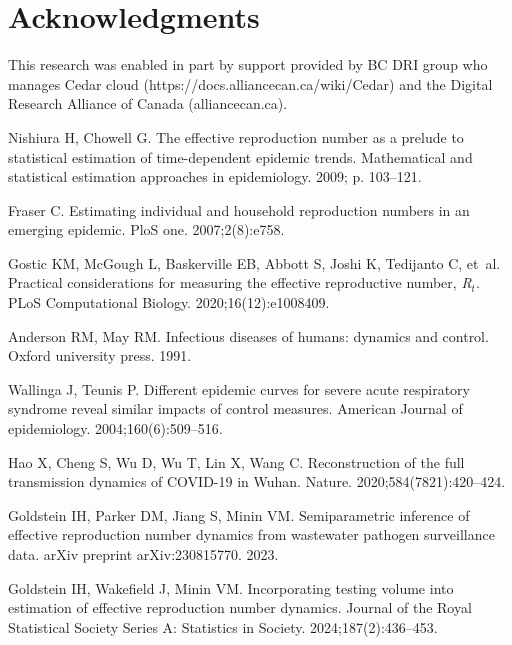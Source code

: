 \documentclass[10pt,letterpaper]{article}
\begin{document}
\section*{Acknowledgments}

This research was enabled in part by support provided by 
BC DRI group who manages Cedar cloud (https://docs.alliancecan.ca/wiki/Cedar)
and the Digital Research Alliance of Canada (alliancecan.ca).

\nolinenumbers


\begin{thebibliography}{10}

  Nishiura H, Chowell G.
  \newblock The effective reproduction number as a prelude to statistical
    estimation of time-dependent epidemic trends.
  \newblock Mathematical and statistical estimation approaches in epidemiology.
    2009; p. 103--121.
  
  Fraser C.
  \newblock Estimating individual and household reproduction numbers in an
    emerging epidemic.
  \newblock PloS one. 2007;2(8):e758.
  
  Gostic KM, McGough L, Baskerville EB, Abbott S, Joshi K, Tedijanto C, et~al.
  \newblock Practical considerations for measuring the effective reproductive
    number, \emph{R}$_t$.
  \newblock PLoS Computational Biology. 2020;16(12):e1008409.
  
  Anderson RM, May RM.
  \newblock Infectious diseases of humans: dynamics and control.
  \newblock Oxford university press. 1991.
  
  Wallinga J, Teunis P.
  \newblock Different epidemic curves for severe acute respiratory syndrome
    reveal similar impacts of control measures.
  \newblock American Journal of epidemiology. 2004;160(6):509--516.
  
  Hao X, Cheng S, Wu D, Wu T, Lin X, Wang C.
  \newblock Reconstruction of the full transmission dynamics of COVID-19 in
    Wuhan.
  \newblock Nature. 2020;584(7821):420--424.
  
  Goldstein IH, Parker DM, Jiang S, Minin VM.
  \newblock Semiparametric inference of effective reproduction number dynamics
    from wastewater pathogen surveillance data.
  \newblock arXiv preprint arXiv:230815770. 2023.
  
  Goldstein IH, Wakefield J, Minin VM.
  \newblock Incorporating testing volume into estimation of effective
    reproduction number dynamics.
  \newblock Journal of the Royal Statistical Society Series A: Statistics in
    Society. 2024;187(2):436--453.
  

\end{thebibliography}
\end{document}
